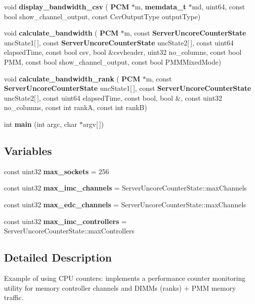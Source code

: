 \begin{DoxyCompactItemize}
\item 
\mbox{\label{pcm-memory_8cpp_a5445e32b3826554ee75842e5ee42022a}} 
void {\bfseries display\+\_\+bandwidth\+\_\+csv} (\textbf{ P\+CM} $\ast$m, \textbf{ memdata\+\_\+t} $\ast$md, uint64, const bool show\+\_\+channel\+\_\+output, const Csv\+Output\+Type output\+Type)
\item 
\mbox{\label{pcm-memory_8cpp_ad1b8139bcf754d554d286313e55a02e9}} 
void {\bfseries calculate\+\_\+bandwidth} (\textbf{ P\+CM} $\ast$m, const \textbf{ Server\+Uncore\+Counter\+State} unc\+State1[$\,$], const \textbf{ Server\+Uncore\+Counter\+State} unc\+State2[$\,$], const uint64 elapsed\+Time, const bool csv, bool \&csvheader, uint32 no\+\_\+columns, const bool P\+MM, const bool show\+\_\+channel\+\_\+output, const bool P\+M\+M\+Mixed\+Mode)
\item 
\mbox{\label{pcm-memory_8cpp_a9f4af394a4e32fcada890d7e49d30de0}} 
void {\bfseries calculate\+\_\+bandwidth\+\_\+rank} (\textbf{ P\+CM} $\ast$m, const \textbf{ Server\+Uncore\+Counter\+State} unc\+State1[$\,$], const \textbf{ Server\+Uncore\+Counter\+State} unc\+State2[$\,$], const uint64 elapsed\+Time, const bool, bool \&, const uint32 no\+\_\+columns, const int rankA, const int rankB)
\item 
\mbox{\label{pcm-memory_8cpp_a0ddf1224851353fc92bfbff6f499fa97}} 
int {\bfseries main} (int argc, char $\ast$argv[$\,$])
\end{DoxyCompactItemize}
\subsection*{Variables}
\begin{DoxyCompactItemize}
\item 
\mbox{\label{pcm-memory_8cpp_a7ef99323bd02eadd1f92faf654a892be}} 
const uint32 {\bfseries max\+\_\+sockets} = 256
\item 
\mbox{\label{pcm-memory_8cpp_a2722bd2db68b8fa831786ce704a82bbb}} 
const uint32 {\bfseries max\+\_\+imc\+\_\+channels} = Server\+Uncore\+Counter\+State\+::max\+Channels
\item 
\mbox{\label{pcm-memory_8cpp_af68e3f949d58c90477796d2e9e12cfcc}} 
const uint32 {\bfseries max\+\_\+edc\+\_\+channels} = Server\+Uncore\+Counter\+State\+::max\+Channels
\item 
\mbox{\label{pcm-memory_8cpp_a28391e4324f1778377c0097955227f39}} 
const uint32 {\bfseries max\+\_\+imc\+\_\+controllers} = Server\+Uncore\+Counter\+State\+::max\+Controllers
\end{DoxyCompactItemize}


\subsection{Detailed Description}
Example of using C\+PU counters\+: implements a performance counter monitoring utility for memory controller channels and D\+I\+M\+Ms (ranks) + P\+MM memory traffic. 

